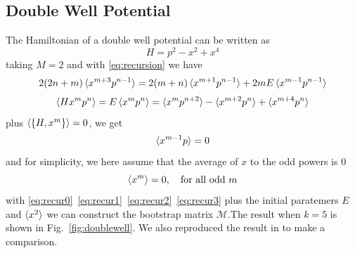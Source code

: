 \documentclass[aps,prl, preprint,amsmath, amssymb]{revtex4-2}
\begin{document}
\subsection {Double Well Potential}
The Hamiltonian of a double well potential can be written as
\begin{equation}
    H = p^2 - x^2 + x^4
\end{equation}
taking $M = 2$ and with \eqref{eq:recursion} we have
\begin{equation}
    2(2n + m)\braket{x^{m + 3} p^{n - 1}} = 2(m + n)\braket{x^{m + 1} p^{n - 1}} + 2mE\braket{x^{m - 1} p^{n - 1}} \label{eq:recur0}
\end{equation}
\begin{equation}
    \braket{Hx^m p^n} = E\braket{x^m p^n} = \braket{x^m p^{n + 2}} - \braket{x^{m + 2} p^n} + \braket{x^{m + 4} p^n} \label{eq:recur1}
\end{equation}
plus $\braket{\{H, x^m\}} = 0$, we get
\begin{equation}
    \braket{x^{m - 1} p} = 0 \label{eq:recur2}
\end{equation}
and for simplicity, we here assume that the average of $x$ to the odd powers is $0$ 
\begin{equation}
    \braket{x^m} = 0,\ \ \ \text{for all odd}\ m \label{eq:recur3}
\end{equation}
with \eqref{eq:recur0}~\eqref{eq:recur1}~\eqref{eq:recur2}~\eqref{eq:recur3} plus the initial paratemers $E$ and $\braket{x^2}$ we can construct the bootstrap matrix $\bm{\mathcal{M}}$.The result when $k = 5$ is shown in Fig.~\ref{fig:doublewell}. We also reproduced the result in \cite{Nakayama_2022} to make a comparison.
\end{document}
